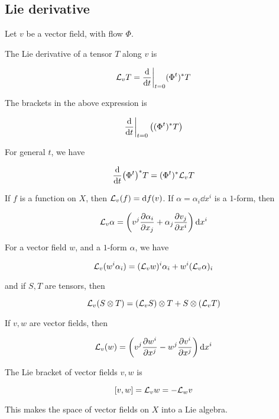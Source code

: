 \subsection{Lie derivative}

Let \(v\) be a vector field, with flow \(\Phi\).

\begin{definition}

    The Lie derivative of a tensor \(T\) along \(v\) is

    \[\mathcal{L}_vT = \dv{t}\bigg\vert_{t=0}(\Phi^t)^*T\]
\end{definition}

\begin{remark}
    The brackets in the above expression is

    \[\dv{t}\bigg\vert_{t=0}\left((\Phi^t)^*T\right)\]
\end{remark}

\begin{lemma}
    For general \(t\), we have

    \[\dv{t}(\Phi^t)^*T = (\Phi^t)^*\mathcal{L}_vT\]
\end{lemma}

\begin{lemma}
    If \(f\) is a function on \(X\), then \(\mathcal{L}_v(f) = \dd f(v)\). If \(\alpha = \alpha_i \dd x^i\) is a \(1\)-form, then

    \[\mathcal{L}_v\alpha = \left(v^j\pdv{\alpha_i}{x_j} + \alpha_j\pdv{v_j}{x^i}\right)\dd x^i\]
\end{lemma}

\begin{lemma}
    For a vector field \(w\), and a \(1\)-form \(\alpha\), we have

    \[\mathcal{L}_v(w^i\alpha_i) = (\mathcal{L}_v w)^i \alpha_i + w^i(\mathcal{L}_v\alpha)_i\]

    and if \(S, T\) are tensors, then

    \[\mathcal{L}_v(S \otimes T) = (\mathcal{L}_v S)\otimes T + S \otimes (\mathcal{L}_v T)\]
\end{lemma}

\begin{corollary}
    If \(v, w\) are vector fields, then

    \[\mathcal{L}_v(w) = \left(v^j \pdv{w^i}{x^j} - w^j\pdv{v^i}{x^j}\right)\dd x^i\]
\end{corollary}

\begin{definition}

    The Lie bracket of vector fields \(v, w\) is

    \[[v, w] = \mathcal{L}_vw = -\mathcal{L}_w v\]

    This makes the space of vector fields on \(X\) into a Lie algebra.
\end{definition}

